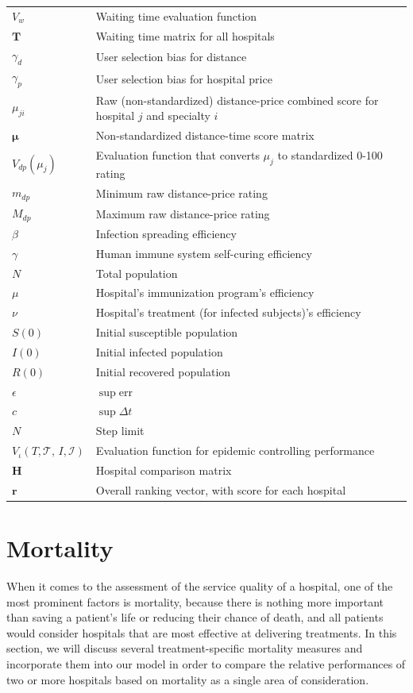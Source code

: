 \documentclass{article}
\begin{document}
{\begin{center}
\begin{longtable}{l| l{500pt}}
        $V_w$ & Waiting time evaluation function\\
        $\mathbf{T}$ & Waiting time matrix for all hospitals\\
        $\gamma_d$ & User selection bias for distance\\
        $\gamma_p$ & User selection bias for hospital price\\
        $\mu_{ji}$ & Raw (non-standardized) distance-price combined score for hospital $j$ and specialty $i$\\
        $\boldsymbol{\mu}$ & Non-standardized distance-time score matrix\\
        $V_{dp}\left(\mu_j\right)$ & Evaluation function that converts $\mu_j$ to standardized 0-100 rating \\
        $m_{dp}$ & Minimum raw distance-price rating\\
        $M_{dp}$ & Maximum raw distance-price rating \\
        $\beta$ & Infection spreading efficiency \\
        $\gamma$ & Human immune system self-curing efficiency \\
        $N$ & Total population \\
        $\mu$ & Hospital's immunization program's efficiency \\
        $\nu$ & Hospital's treatment (for infected subjects)'s efficiency \\
        $S(0)$ & Initial susceptible population \\
        $I(0)$ & Initial infected population \\
        $R(0)$ & Initial recovered population \\
        $\epsilon$ & $\sup\mathrm{err}$ \\
        $c$ & $\sup\Delta t$ \\
        $N$ & Step limit \\
        $V_\iota(T,\mathcal{T},\,I,\mathcal{I})$ & Evaluation function for epidemic controlling performance \\
        \textbf{H} & Hospital comparison matrix\\
        $\mathbf{r}$ & Overall ranking vector, with score for each hospital
    \end{longtable}
    \label{tab:symbol_def}
\end{center}
}


\section{Mortality}\label{sec:mortality}
When it comes to the assessment of the service quality of a hospital, one of the most prominent factors is mortality, because there is nothing more important than saving a patient's life or reducing their chance of death, and all patients would consider hospitals that are most effective at delivering treatments.  In this section, we will discuss several treatment-specific mortality measures and incorporate them into our model in order to compare the relative performances of two or more hospitals based on mortality as a single area of consideration.
\end{document}

